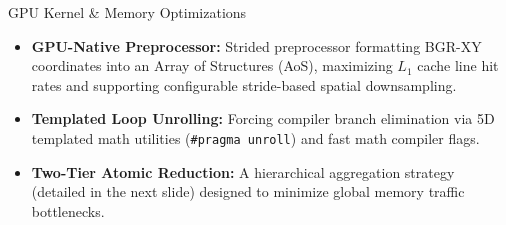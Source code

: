 \documentclass[11pt]{beamer}
\begin{document}
\begin{frame}{GPU Kernel \& Memory Optimizations}
    \begin{itemize}
        \item \textbf{GPU-Native Preprocessor:} Strided preprocessor formatting BGR-XY coordinates into an Array of Structures (AoS), maximizing $L_1$ cache line hit rates and supporting configurable stride-based spatial downsampling.
        \item \textbf{Templated Loop Unrolling:} Forcing compiler branch elimination via 5D templated math utilities (\texttt{\#pragma unroll}) and fast math compiler flags.
        \item \textbf{Two-Tier Atomic Reduction:} A hierarchical aggregation strategy (detailed in the next slide) designed to minimize global memory traffic bottlenecks.
    \end{itemize}
\end{frame}
\end{document}
